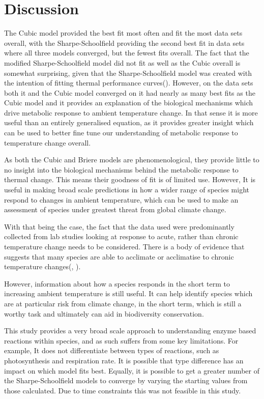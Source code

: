 \documentclass[11pt]{article}
\begin{document}
\section{Discussion}
The Cubic model provided the best fit most often and fit the most data sets overall, with the Sharpe-Schoolfield providing the second best fit in data sets where all three models converged, but the fewest fits overall. The fact that the modified Sharpe-Schoolfield model did not fit as well as the Cubic overall is somewhat surprising, given that the Sharpe-Schoolfield model was created with the intention of fitting thermal performance curves(\cite{Schoolfield1981}). However, on the data sets both it and the Cubic model converged on it had nearly as many best fits as the Cubic model and it provides an explanation of the biological mechanisms which drive metabolic response to ambient temperature change. In that sense it is more useful than an entirely generalised equation, as it provides greater insight which can be used to better fine tune our understanding of metabolic response to temperature change overall. 

As both the Cubic and Briere models are phenomenological, they provide little to no insight into the biological mechanisms behind the metabolic response to thermal change. This means their goodness of fit is of limited use. However, It is useful in making broad scale predictions in how a wider range of species might respond to changes in ambient temperature, which can be used to make an assessment of species under greatest threat from global climate change. 

With that being the case, the fact that the data used were predominantly collected from lab studies looking at response to acute, rather than chronic temperature change needs to be considered. There is a body of evidence that suggests that many species are able to acclimate or acclimatise to chronic temperature changes(\cite{Schulte2011}, \cite{Podrabsky2004}). 

However, information about how a species responds in the short term to increasing ambient temperature is still useful. It can help identify species which are at particular risk from climate change, in the short term, which is still a worthy task and ultimately can aid in biodiversity conservation.   

This study provides a very broad scale approach to understanding enzyme based reactions within species, and as such suffers from some key limitations. For example, It does not differentiate between types of reactions, such as photosynthesis and respiration rate. It is possible that type difference has an impact on which model fits best. Equally, it is possible to get a greater number of the Sharpe-Schoolfield models to converge by varying the starting values from those calculated. Due to time constraints this was not feasible in this study. 
\end{document}
